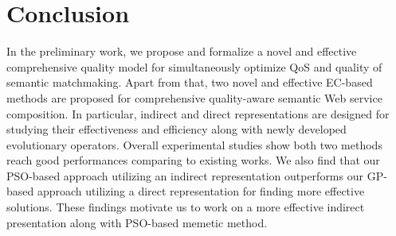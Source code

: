 \section{Conclusion}\label{summary2}
In the preliminary work, we propose and formalize a novel and effective comprehensive quality model for simultaneously optimize QoS and quality of semantic matchmaking. Apart from that, two novel and effective EC-based methods are proposed for comprehensive quality-aware semantic Web service composition. In particular, indirect and direct representations are designed for studying their effectiveness and efficiency along with newly developed evolutionary operators. Overall experimental studies show both two methods reach good performances comparing to existing works. We also find that our PSO-based approach utilizing an indirect representation outperforms our GP-based approach utilizing a direct representation for finding more effective solutions. These findings motivate us to work on a more effective indirect presentation along with PSO-based memetic method.
